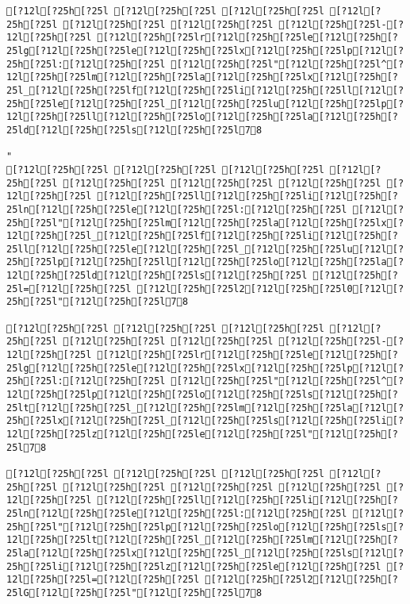 \documentclass{scrartcl}
\begin{document}
\begin{Verbatim}
[?12l[?25h[?25l [?12l[?25h[?25l [?12l[?25h[?25l [?12l[?25h[?25l [?12l[?25h[?25l [?12l[?25h[?25l [?12l[?25h[?25l-[?12l[?25h[?25l [?12l[?25h[?25lr[?12l[?25h[?25le[?12l[?25h[?25lg[?12l[?25h[?25le[?12l[?25h[?25lx[?12l[?25h[?25lp[?12l[?25h[?25l:[?12l[?25h[?25l [?12l[?25h[?25l"[?12l[?25h[?25l^[?12l[?25h[?25lm[?12l[?25h[?25la[?12l[?25h[?25lx[?12l[?25h[?25l_[?12l[?25h[?25lf[?12l[?25h[?25li[?12l[?25h[?25ll[?12l[?25h[?25le[?12l[?25h[?25l_[?12l[?25h[?25lu[?12l[?25h[?25lp[?12l[?25h[?25ll[?12l[?25h[?25lo[?12l[?25h[?25la[?12l[?25h[?25ld[?12l[?25h[?25ls[?12l[?25h[?25l78

"
[?12l[?25h[?25l [?12l[?25h[?25l [?12l[?25h[?25l [?12l[?25h[?25l [?12l[?25h[?25l [?12l[?25h[?25l [?12l[?25h[?25l [?12l[?25h[?25l [?12l[?25h[?25ll[?12l[?25h[?25li[?12l[?25h[?25ln[?12l[?25h[?25le[?12l[?25h[?25l:[?12l[?25h[?25l [?12l[?25h[?25l"[?12l[?25h[?25lm[?12l[?25h[?25la[?12l[?25h[?25lx[?12l[?25h[?25l_[?12l[?25h[?25lf[?12l[?25h[?25li[?12l[?25h[?25ll[?12l[?25h[?25le[?12l[?25h[?25l_[?12l[?25h[?25lu[?12l[?25h[?25lp[?12l[?25h[?25ll[?12l[?25h[?25lo[?12l[?25h[?25la[?12l[?25h[?25ld[?12l[?25h[?25ls[?12l[?25h[?25l [?12l[?25h[?25l=[?12l[?25h[?25l [?12l[?25h[?25l2[?12l[?25h[?25l0[?12l[?25h[?25l"[?12l[?25h[?25l78

[?12l[?25h[?25l [?12l[?25h[?25l [?12l[?25h[?25l [?12l[?25h[?25l [?12l[?25h[?25l [?12l[?25h[?25l [?12l[?25h[?25l-[?12l[?25h[?25l [?12l[?25h[?25lr[?12l[?25h[?25le[?12l[?25h[?25lg[?12l[?25h[?25le[?12l[?25h[?25lx[?12l[?25h[?25lp[?12l[?25h[?25l:[?12l[?25h[?25l [?12l[?25h[?25l"[?12l[?25h[?25l^[?12l[?25h[?25lp[?12l[?25h[?25lo[?12l[?25h[?25ls[?12l[?25h[?25lt[?12l[?25h[?25l_[?12l[?25h[?25lm[?12l[?25h[?25la[?12l[?25h[?25lx[?12l[?25h[?25l_[?12l[?25h[?25ls[?12l[?25h[?25li[?12l[?25h[?25lz[?12l[?25h[?25le[?12l[?25h[?25l"[?12l[?25h[?25l78

[?12l[?25h[?25l [?12l[?25h[?25l [?12l[?25h[?25l [?12l[?25h[?25l [?12l[?25h[?25l [?12l[?25h[?25l [?12l[?25h[?25l [?12l[?25h[?25l [?12l[?25h[?25ll[?12l[?25h[?25li[?12l[?25h[?25ln[?12l[?25h[?25le[?12l[?25h[?25l:[?12l[?25h[?25l [?12l[?25h[?25l"[?12l[?25h[?25lp[?12l[?25h[?25lo[?12l[?25h[?25ls[?12l[?25h[?25lt[?12l[?25h[?25l_[?12l[?25h[?25lm[?12l[?25h[?25la[?12l[?25h[?25lx[?12l[?25h[?25l_[?12l[?25h[?25ls[?12l[?25h[?25li[?12l[?25h[?25lz[?12l[?25h[?25le[?12l[?25h[?25l [?12l[?25h[?25l=[?12l[?25h[?25l [?12l[?25h[?25l2[?12l[?25h[?25lG[?12l[?25h[?25l"[?12l[?25h[?25l78


\end{Verbatim}
\end{document}
